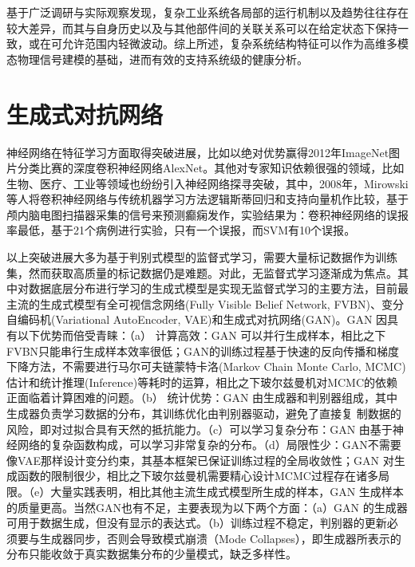 基于广泛调研与实际观察发现，复杂工业系统各局部的运行机制以及趋势往往存在较大差异，而其与自身历史以及与其他部件间的关联关系可以在给定状态下保持一致，或在可允许范围内轻微波动。综上所述，复杂系统结构特征可以作为{\heiti 高维多模态物理信号建模}的基础，进而有效的支持系统级的健康分析。

\section{生成式对抗网络}
\label{sec:gan-review}

神经网络在特征学习方面取得突破进展\cite{lecun2015deep}，比如以绝对优势赢得2012年ImageNet图片分类比赛的深度卷积神经网络AlexNet\cite{krizhevsky2012imagenet}。其他对专家知识依赖很强的领域，比如生物\cite{webb2018deep}、医疗\cite{mirowski2008comparing}、工业\cite{tsui2015prognostics}等领域也纷纷引入神经网络探寻突破，其中，2008年，Mirowski 等人将卷积神经网络与传统机器学习方法逻辑斯蒂回归和支持向量机作比较，基于颅内脑电图扫描器采集的信号来预测癫痫发作，实验结果为：卷积神经网络的误报率最低，基于21个病例进行实验，只有一个误报，而SVM有10个误报\cite{mirowski2008comparing}。

以上突破进展大多为基于判别式模型的监督式学习，需要大量标记数据作为训练集，然而获取高质量的标记数据仍是难题。对此，无监督式学习逐渐成为焦点\cite{lecun2015deep}。其中对数据底层分布进行学习的生成式模型是实现无监督式学习的主要方法，目前最主流的生成式模型有全可视信念网络(Fully Visible Belief Network, FVBN)\cite{frey1998graphical}、变分自编码机(Variational AutoEncoder, VAE)\cite{russakovsky2015imagenet}和生成式对抗网络(GAN)\cite{goodfellow2014generative}。GAN 因具有以下优势而倍受青睐：（a） 计算高效：GAN 可以并行生成样本，相比之下FVBN只能串行生成样本效率很低；GAN的训练过程基于快速的反向传播和梯度下降方法，不需要进行马尔可夫链蒙特卡洛(Markov Chain Monte Carlo, MCMC)估计和统计推理(Inference)等耗时的运算，相比之下玻尔兹曼机对MCMC的依赖正面临着计算困难的问题\cite{salakhutdinov2010efficient}。（b） 统计优势：GAN 由生成器和判别器组成，其中生成器负责学习数据的分布，其训练优化由判别器驱动，避免了直接复 制数据的风险，即对过拟合具有天然的抵抗能力。（c）可以学习复杂分布：GAN 由基于神经网络的复杂函数构成，可以学习非常复杂的分布。（d）局限性少：GAN不需要像VAE那样设计变分约束，其基本框架已保证训练过程的全局收敛性；GAN 对生成函数的限制很少，相比之下玻尔兹曼机需要精心设计MCMC过程存在诸多局限。（e）大量实践表明，相比其他主流生成式模型所生成的样本，GAN 生成样本的质量更高。当然GAN也有不足，主要表现为以下两个方面：（a）GAN 的生成器可用于数据生成，但没有显示的表达式。（b）训练过程不稳定，判别器的更新必须要与生成器同步，否则会导致模式崩溃（Mode Collapses），即生成器所表示的分布只能收敛于真实数据集分布的少量模式，缺乏多样性。

